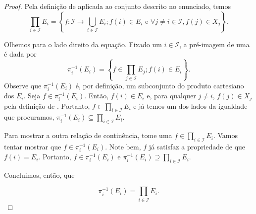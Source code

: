 \begin{proof}
    
    Pela definição de  aplicada ao conjunto descrito no enunciado, temos
    \begin{equation*}
        \prod_{i \in \mathcal{I}} E_i = \left\{f:\mathcal{I}\rightarrow \bigcup_{i \in \mathcal{I}} E_i; f(i)\in E_i \text{ e } \forall j\neq i \in \mathcal{I}, f(j)\in X_j\right\}.
    \end{equation*}

    Olhemos para o lado direito da equação. Fixado um $i\in\mathcal{I}$, a pré-imagem de uma  é dada por
    \begin{equation*}
        \pi_{i}^{-1}(E_i) = \left\{f\in \prod_{j\in\mathcal{I}}E_j; f(i)\in E_i\right\}.
    \end{equation*}
    Observe que $\pi_{i}^{-1}(E_i)$ é, por definição, um subconjunto do produto cartesiano dos $E_i$. Seja $f\in\pi_{i}^{-1}(E_i)$. Então, $f(i)\in E_i$ e, para qualquer $j\neq i$, $f(j)\in X_j$ pela definição de . Portanto, $f\in \prod_{i \in \mathcal{I}} E_i$ e já temos um dos lados da igualdade que procuramos, $\pi_{i}^{-1}(E_i)\subseteq \prod_{i \in \mathcal{I}} E_i$.

    Para mostrar a outra relação de continência, tome uma $f\in \prod_{i \in \mathcal{I}} E_i$. Vamos tentar mostrar que $f\in \pi_{i}^{-1}(E_i)$. Note bem, $f$ já satisfaz a propriedade de que $f(i)=E_i$. Portanto, $f\in \pi_{i}^{-1}(E_i)$ e $\pi_{i}^{-1}(E_i)\supseteq \prod_{i \in \mathcal{I}} E_i$.
    
    Concluimos, então, que 

    \begin{equation*}
        \pi_{i}^{-1}(E_i) = \prod_{i \in \mathcal{I}} E_i.
    \end{equation*}
\end{proof}